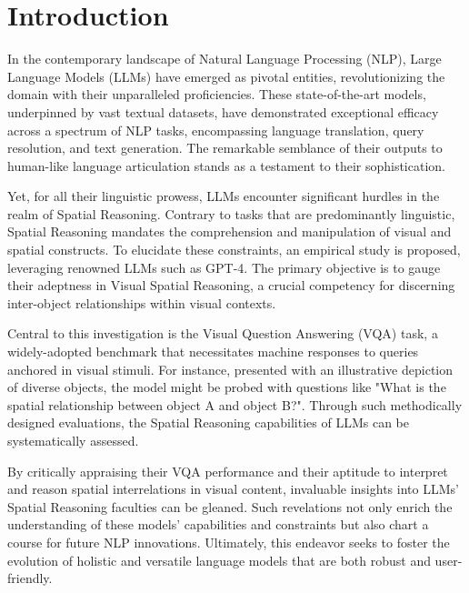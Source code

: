\documentclass[twocolumn,11pt]{report}
\begin{document}
\newpage




\twocolumn
\chapter{Introduction}\label{chap:intro}

In the contemporary landscape of Natural Language Processing (NLP), Large Language Models (LLMs) have emerged as pivotal entities, revolutionizing the domain with their unparalleled proficiencies. These state-of-the-art models, underpinned by vast textual datasets, have demonstrated exceptional efficacy across a spectrum of NLP tasks, encompassing language translation, query resolution, and text generation. The remarkable semblance of their outputs to human-like language articulation stands as a testament to their sophistication.

Yet, for all their linguistic prowess, LLMs encounter significant hurdles in the realm of Spatial Reasoning. Contrary to tasks that are predominantly linguistic, Spatial Reasoning mandates the comprehension and manipulation of visual and spatial constructs. To elucidate these constraints, an empirical study is proposed, leveraging renowned LLMs such as GPT-4\cite{peng2023instruction}. The primary objective is to gauge their adeptness in Visual Spatial Reasoning, a crucial competency for discerning inter-object relationships within visual contexts.

Central to this investigation is the Visual Question Answering (VQA) task, a widely-adopted benchmark that necessitates machine responses to queries anchored in visual stimuli. For instance, presented with an illustrative depiction of diverse objects, the model might be probed with questions like "What is the spatial relationship between object A and object B?". Through such methodically designed evaluations, the Spatial Reasoning capabilities of LLMs can be systematically assessed.

By critically appraising their VQA performance and their aptitude to interpret and reason spatial interrelations in visual content, invaluable insights into LLMs' Spatial Reasoning faculties can be gleaned. Such revelations not only enrich the understanding of these models' capabilities and constraints but also chart a course for future NLP innovations. Ultimately, this endeavor seeks to foster the evolution of holistic and versatile language models that are both robust and user-friendly.
\end{document}
